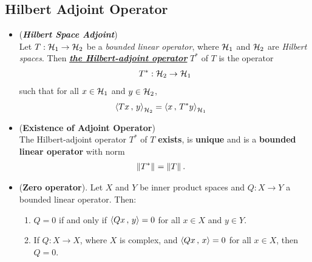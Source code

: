 \documentclass[11pt]{article}
\begin{document}
\subsection{Hilbert Adjoint Operator}
\begin{itemize}
\item \begin{definition} (\emph{\textbf{Hilbert Space Adjoint}})\\
Let $T: {\mathcal H}_{1} \rightarrow {\mathcal H}_{2}$ be a \emph{bounded linear operator}, where ${\mathcal H}_1$ and ${\mathcal H}_2$ are \emph{Hilbert spaces}. Then \underline{\emph{\textbf{the Hilbert-adjoint operator}}} $T^{*}$ of $T$ is the operator
\begin{align*}
T^{*}: {\mathcal H}_2 \rightarrow {\mathcal H}_1
\end{align*} such that for all $x \in {\mathcal H}_1$ and $y \in {\mathcal H}_2$,
\begin{align}
\left\langle Tx\,,\, y \right\rangle_{{\mathcal H}_2} &= \left\langle x\,,\, T^{*}y \right\rangle_{{\mathcal H}_1} \label{eqn: hilbert_space_adjoint}
\end{align}
\end{definition}


\item \begin{proposition} (\textbf{Existence of Adjoint Operator}) \citep{kreyszig1989introductory}\\
The Hilbert-adjoint operator $T^{*}$ of $T$ \textbf{exists}, is \textbf{unique} and is a \textbf{bounded linear operator} with norm
\begin{align*}
\left\|T^{*}\right\|_{} &= \left\|T\right\|_{}.
\end{align*}
\end{proposition}

\item \begin{lemma}  (\textbf{Zero operator}). \citep{kreyszig1989introductory}
Let $X$ and $Y$ be inner product spaces and $Q: X \rightarrow Y$ a bounded linear operator. Then:
\begin{enumerate}
\item $Q = 0$ if and only if $\left\langle Qx\,,\, y \right\rangle = 0$ for all $x \in X$ and $y \in Y$.
\item If $Q: X \rightarrow X$, where $X$ is complex, and $\left\langle Qx\,,\, x \right\rangle= 0$ for all $x \in X$, then $Q=0$.
\end{enumerate}
\end{lemma}


\end{itemize}
\end{document}
